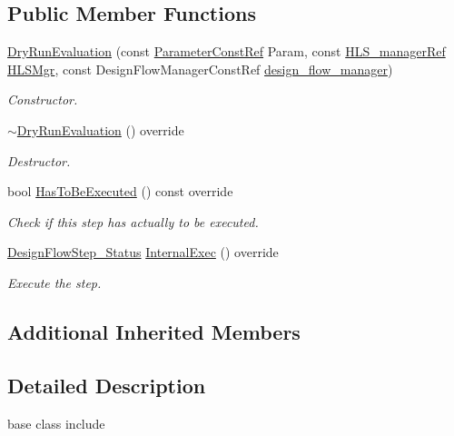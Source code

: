 \subsection*{Public Member Functions}
\begin{DoxyCompactItemize}
\item 
\hyperlink{classDryRunEvaluation_ac9aa5c40633fb63835bf19e5e10b74bc}{Dry\+Run\+Evaluation} (const \hyperlink{Parameter_8hpp_a37841774a6fcb479b597fdf8955eb4ea}{Parameter\+Const\+Ref} Param, const \hyperlink{hls__manager_8hpp_acd3842b8589fe52c08fc0b2fcc813bfe}{H\+L\+S\+\_\+manager\+Ref} \hyperlink{classHLS__step_ade85003a99d34134418451ddc46a18e9}{H\+L\+S\+Mgr}, const Design\+Flow\+Manager\+Const\+Ref \hyperlink{classDesignFlowStep_ab770677ddf087613add30024e16a5554}{design\+\_\+flow\+\_\+manager})
\begin{DoxyCompactList}\small\item\em Constructor. \end{DoxyCompactList}\item 
\hyperlink{classDryRunEvaluation_af96f8b630ad53101c5ec8d67944e55c9}{$\sim$\+Dry\+Run\+Evaluation} () override
\begin{DoxyCompactList}\small\item\em Destructor. \end{DoxyCompactList}\item 
bool \hyperlink{classDryRunEvaluation_a57360a240bb8752db568be9228abaf58}{Has\+To\+Be\+Executed} () const override
\begin{DoxyCompactList}\small\item\em Check if this step has actually to be executed. \end{DoxyCompactList}\item 
\hyperlink{design__flow__step_8hpp_afb1f0d73069c26076b8d31dbc8ebecdf}{Design\+Flow\+Step\+\_\+\+Status} \hyperlink{classDryRunEvaluation_ac02b87b6c4472543d68a1d41acb2404a}{Internal\+Exec} () override
\begin{DoxyCompactList}\small\item\em Execute the step. \end{DoxyCompactList}\end{DoxyCompactItemize}
\subsection*{Additional Inherited Members}


\subsection{Detailed Description}
base class include 


